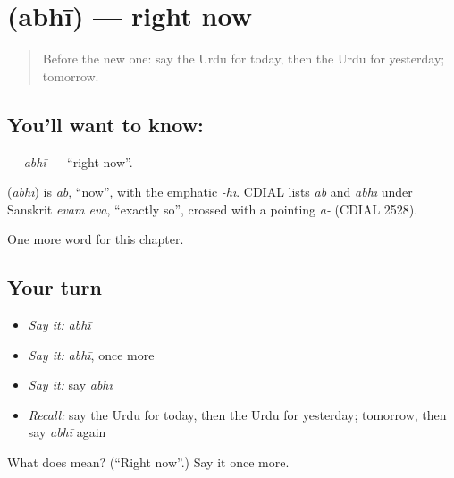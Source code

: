 \section[\texorpdfstring{\ur{ابھی} (abhī)}{ابھی (abhī)}]{ (abhī) — right now}

\label{lesson:UR-C76-abhi}



\begin{quote}
Before the new one: say the Urdu for today, then the Urdu for yesterday; tomorrow.
\end{quote}

\subsection*{You'll want to know: }
\textbf{} — \emph{abhī} — \textquotedblleft{}right now\textquotedblright{}.

\begin{cousinweb}
\textbf{} (\emph{abhī}) is \emph{ab}, \textquotedblleft{}now\textquotedblright{}, with the emphatic \emph{-hī}. CDIAL lists \emph{ab} and \emph{abhī} under Sanskrit \emph{evam eva}, \textquotedblleft{}exactly so\textquotedblright{}, crossed with a pointing \emph{a-} (CDIAL 2528).
\end{cousinweb}

\begin{grammarlens}[title={What you've built}]
One more word for this chapter.
\end{grammarlens}

\subsection*{Your turn}
\begin{itemize}
\raggedright
  \item \emph{Say it:} \emph{abhī}
  \item \emph{Say it:} \emph{abhī}, once more
  \item \emph{Say it:} say \emph{abhī}
  \item \emph{Recall:} say the Urdu for today, then the Urdu for yesterday; tomorrow, then say \emph{abhī} again
\end{itemize}

\begin{tcolorbox}[breakable,colback=teal!4,colframe=teal!35!black,title={Before you move on}]
What does  mean? (\textquotedblleft{}Right now\textquotedblright{}.) Say it once more.
\end{tcolorbox}
